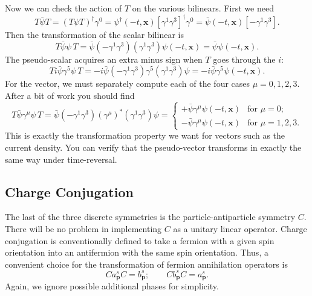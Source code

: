 Now we can check the action of $T$ on the various bilinears.  First we need
\begin{equation}
  T\bar{\psi}T = (T\psi T)^{\dagger}\gamma^0
    = \psi^{\dagger}(-t,\mathbf{x})[\gamma^1\gamma^3]^{\dagger}\gamma^0
    = \bar{\psi}(-t,\mathbf{x})[-\gamma^1\gamma^3] .
  \label{eq:3.131}
\end{equation}
Then the transformation of the scalar bilinear is
\begin{equation}
  T\bar{\psi}\psi\,T = \bar{\psi}(-\gamma^1\gamma^3)(\gamma^1\gamma^3)\psi(-t,\mathbf{x})
    = \bar{\psi}\psi(-t,\mathbf{x}) .
  \label{eq:3.132}
\end{equation}
The pseudo-scalar acquires an extra minus sign when $T$ goes through the $i$:
\begin{equation}
  Ti\bar{\psi}\gamma^5\psi\,T = -i\bar{\psi}(-\gamma^1\gamma^3)\gamma^5
    (\gamma^1\gamma^3)\psi = -i\bar{\psi}\gamma^5\psi(-t,\mathbf{x}).
\end{equation}
For the vector, we must separately compute each of the four cases
$\mu = 0, 1, 2, 3$.  After a bit of work you should find
\begin{equation}
  T\bar{\psi}\gamma^\mu\psi\,T =
    \bar{\psi}(-\gamma^1\gamma^3)(\gamma^\mu)^{*}(\gamma^1\gamma^3)\psi
    = \begin{cases}
        +\bar{\psi}\gamma^\mu\psi(-t,\mathbf{x}) & \text{for } \mu = 0;\\
        -\bar{\psi}\gamma^\mu\psi(-t,\mathbf{x}) & \text{for } \mu = 1, 2, 3 .
      \end{cases}
  \label{eq:3.133}
\end{equation}
This is exactly the transformation property we want for vectors such as the
current density.  You can verify that the pseudo-vector transforms in exactly
the same way under time-reversal.

\subsection{Charge Conjugation}

The last of the three discrete symmetries is the particle-antiparticle
symmetry $C$.  There will be no problem in implementing $C$ as a unitary
linear operator.  Charge conjugation is conventionally defined to take a
fermion with a given spin orientation into an antifermion with the same spin
orientation.  Thus, a convenient choice for the transformation of fermion
annihilation operators is
\begin{equation}
  C a_{\mathbf{p}}^s C = b_{\mathbf{p}}^s;\qquad
  C b_{\mathbf{p}}^s C = a_{\mathbf{p}}^s .
  \label{eq:3.134}
\end{equation}
Again, we ignore possible additional phases for simplicity.

